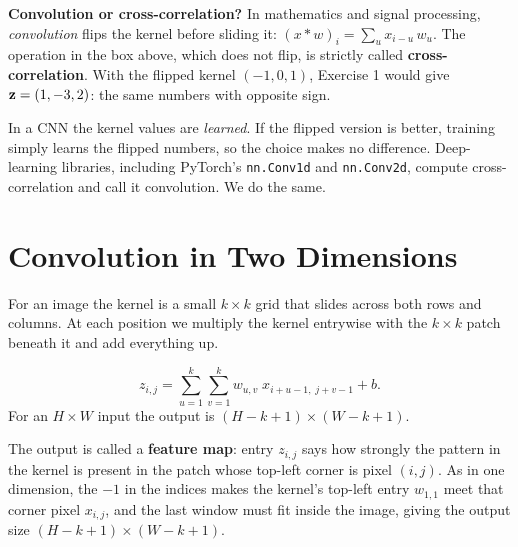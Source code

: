 \documentclass[12pt, a4paper]{article}
\begin{document}
\begin{notebox}
  \textbf{Convolution or cross-correlation?}
  In mathematics and signal processing, \emph{convolution} flips the kernel
  before sliding it:
  $(x * w)_i = \sum_{u} x_{i-u}\, w_u$. The operation in the box above, which
  does not flip, is strictly called \textbf{cross-correlation}.
  With the flipped kernel $(-1, 0, 1)$, Exercise 1 would give
  $\mathbf{z} = (1, -3, 2)$: the same numbers with opposite sign.

  In a CNN the kernel values are \emph{learned}. If the flipped version is
  better, training simply learns the flipped numbers, so the choice makes no
  difference. Deep-learning libraries, including PyTorch's
  \texttt{nn.Conv1d} and \texttt{nn.Conv2d}, compute cross-correlation and
  call it convolution. We do the same.
\end{notebox}

\section{Convolution in Two Dimensions}

For an image the kernel is a small $k \times k$ grid that slides across both
rows and columns. At each position we multiply the kernel entrywise with the
$k \times k$ patch beneath it and add everything up.

\begin{resultbox}
  \[
    z_{i,j} = \sum_{u=1}^{k} \sum_{v=1}^{k} w_{u,v}\; x_{i+u-1,\; j+v-1} + b .
  \]
  For an $H \times W$ input the output is
  $(H - k + 1) \times (W - k + 1)$.
\end{resultbox}

The output is called a \textbf{feature map}: entry $z_{i,j}$ says how
strongly the pattern in the kernel is present in the patch whose top-left
corner is pixel $(i, j)$. As in one dimension, the $-1$ in the indices makes
the kernel's top-left entry $w_{1,1}$ meet that corner pixel $x_{i,j}$, and
the last window must fit inside the image, giving the output size
$(H - k + 1) \times (W - k + 1)$.
\end{document}
